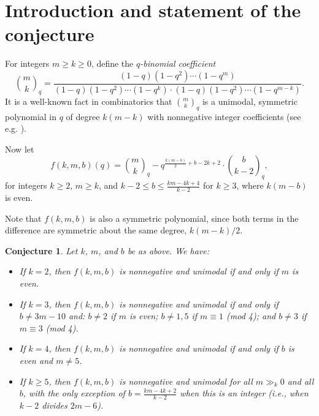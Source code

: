 \documentclass{amsart}
\newtheorem{conjecture}[theorem]{Conjecture}
\begin{document}
\section{Introduction and statement of the conjecture}
For integers $m\ge k\ge 0$, define the \emph{$q$-binomial coefficient}
$$\binom {m}{k}_q=\frac{(1-q)(1-q^2)\cdots (1-q^{m})}{(1-q)(1-q^2)\cdots (1-q^k)\cdot (1-q)(1-q^2)\cdots (1-q^{{m-k}})}.$$
It is a well-known fact in combinatorics that $\binom {m}{k}_q$ is a unimodal, symmetric polynomial in $q$ of degree $k(m-k)$ with nonnegative integer coefficients (see e.g. \cite{OH,Pr1,St5,Sy}).

Now let
$$f(k,m,b)(q)=\binom{m}{k}_q-q^{\frac{k(m-b)}{2}+b-2k+2}\cdot\binom{b}{k-2}_q,$$
for integers $k\ge 2$, $m\ge k$, and $k-2\le b\le \frac{km-4k+4}{k-2}$ for $k\ge 3$, where $k(m-b)$ is even.

Note that $f(k,m,b)$ is also a symmetric polynomial, since both terms in the difference are symmetric about the same degree, $k(m-k)/2$.

\begin{conjecture}\label{conj}
Let $k$, $m$, and $b$ be as above. We have:
\begin{itemize}
\item[ (i)] If $k=2$, then $f(k,m,b)$ is nonnegative and unimodal if and only if $m$ is even.

\item[ (ii)] If $k=3$, then $f(k,m,b)$ is nonnegative and unimodal if and only if $b\ne 3m-10$ and: $b\neq 2$ if $m$ is even; $b\neq 1,5$ if $m\equiv 1$ (mod 4); and $b\neq 3$ if $m\equiv 3$ (mod 4).

\item[ (iii)] If $k=4$, then $f(k,m,b)$ is nonnegative and unimodal if and only if $b$ is even and $m\neq 5$.

\item[ (iv)] If $k\ge 5$, then $f(k,m,b)$ is nonnegative and unimodal for all $m\gg_k 0$ and all $b$, with the only exception of $b=\frac{km-4k+2}{k-2}$ when this is an integer (i.e., when $k-2$ divides $2m-6$).
\end{itemize}
\end{conjecture}
\end{document}
